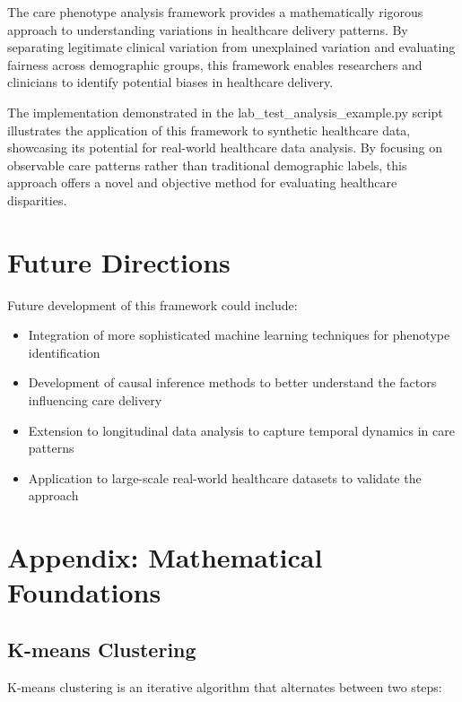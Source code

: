 \documentclass[12pt]{article}
\begin{document}
The care phenotype analysis framework provides a mathematically rigorous approach to understanding variations in healthcare delivery patterns. By separating legitimate clinical variation from unexplained variation and evaluating fairness across demographic groups, this framework enables researchers and clinicians to identify potential biases in healthcare delivery.

The implementation demonstrated in the lab\_test\_analysis\_example.py script illustrates the application of this framework to synthetic healthcare data, showcasing its potential for real-world healthcare data analysis. By focusing on observable care patterns rather than traditional demographic labels, this approach offers a novel and objective method for evaluating healthcare disparities.

\section{Future Directions}

Future development of this framework could include:

\begin{itemize}
    \item Integration of more sophisticated machine learning techniques for phenotype identification
    \item Development of causal inference methods to better understand the factors influencing care delivery
    \item Extension to longitudinal data analysis to capture temporal dynamics in care patterns
    \item Application to large-scale real-world healthcare datasets to validate the approach
\end{itemize}

\section{Appendix: Mathematical Foundations}

\subsection{K-means Clustering}

K-means clustering is an iterative algorithm that alternates between two steps:
\end{document}
